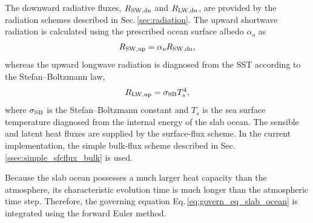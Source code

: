 The downward radiative fluxes, $R_{\rm SW,dn}$ and $R_{\rm LW,dn}$, are provided by the radiation schemes described in Sec.\,\ref{sec:radiation}.
The upward shortwave radiation is calculated using the prescribed ocean surface albedo $\alpha_o$ as
\begin{align}
  R_{\rm SW,up} = \alpha_o R_{\rm SW,dn},
\end{align}
whereas the upward longwave radiation is diagnosed from the SST according to the Stefan--Boltzmann law,
\begin{align}
  R_{\rm LW,up} = \sigma_{\rm SB} T_s^4,
\end{align}
where $\sigma_{\rm SB}$ is the Stefan--Boltzmann constant and
$T_s$ is the sea surface temperature diagnosed from the internal energy of the slab ocean.
The sensible and latent heat fluxes are supplied by the surface-flux scheme.
In the current implementation, the simple bulk-flux scheme described in Sec.\,\ref{ssec:simple_sfcflux_bulk} is used.

Because the slab ocean possesses a much larger heat capacity than the atmosphere,
its characteristic evolution time is much longer than the atmospheric time step.
Therefore, the governing equation Eq.\,\eqref{eq:govern_eq_slab_ocean} is integrated using the forward Euler method. 
